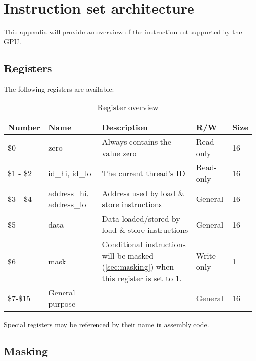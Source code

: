 \documentclass[../main/report.tex]{subfiles}
\begin{document}
\chapter{Instruction set architecture}

This appendix will provide an overview of the instruction set supported by the GPU.

\section{Registers}

The following registers are available:

\begin{table}[H]
    \begin{tabular}{|l|l|p{4cm}|l|l|}
    \hline
    \textbf{Number} & \textbf{Name} & \textbf{Description}                                                             & \textbf{R/W}    & \textbf{Size} \\ \hline \hline
    \$0       & zero                & Always contains the value zero                                          & Read-only  & 16   \\ \hline
    \$1 - \$2 & id\_hi, id\_lo      & The current thread's ID                                                 & Read-only  & 16   \\ \hline
    \$3 - \$4 & address\_hi, address\_lo & Address used by load \& store instructions                              & General    & 16   \\ \hline
    \$5       & data               & Data loaded/stored by load \& store instructions                        & General    & 16   \\ \hline
    \$6       & mask               & Conditional instructions will be masked (\autoref{sec:masking}) when this register is set to 1. & Write-only & 1    \\ \hline
    \$7-\$15  & General-purpose    & ~                                                                       & General    & 16   \\ \hline
    \end{tabular}
    \label{table:registers}
    \caption{Register overview}
\end{table}

Special registers may be referenced by their name in assembly code.

\section{Masking}
\label{sec:masking}
\end{document}
